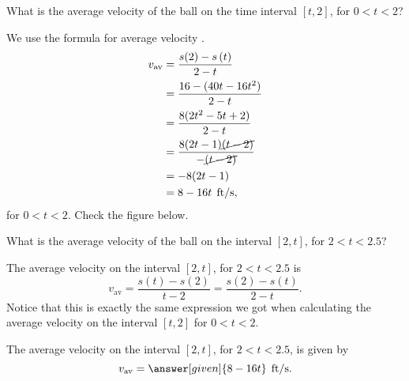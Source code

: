 \documentclass{ximera}
\begin{document}
\begin{example}
\begin{question}
\end{question}
\begin{question}
 What is the average velocity of the ball on the time interval
$[t,2]$, for $0<t<2$? 


\begin{explanation}
We use the  formula for average velocity .
\begin{align*}
v_{\text{av}} &= 
\frac{s(2)-s\left({t}\right)}
{{2}-{t}}\\
&= \frac{16 - (40t-16t^2)}{2-t}\\
&= \frac{8(2t^2-5t+2)}{2-t}\\
&= \frac{8(2t-1)\cancel{(t-2)}}{-\cancel{(t-2)}}\\
&= -8(2t-1)\\
&= 8-16t \hspace{0.06in}\mathrm{ft}/\mathrm{s},
\end{align*}
for $0<t<2$.
Check the figure below.





























\end{explanation}
\end{question}
\begin{question}
 What is the average velocity of the ball on the interval $[2,t]$, for
$2<t<2.5$?

\begin {explanation}

The average velocity on the interval $[2,t]$, for 
$2<t<2.5$ is 
\[
v_{\text{av}} = \frac{s(t)-s(2)}{t-2} = \frac{s(2)-s(t)}{2-t}. 
\]
Notice that this is exactly the same expression we got when calculating
the average velocity on the interval $[t,2]$ for $0<t<2$. 
\end{explanation}

The average velocity on the interval $[2,t]$, for $2<t<2.5$, is given by
\[
v_{\text{av}} =\answer[given]{8-16t}\hspace{0.06in}\mathrm{ft}/\mathrm{s}.
\]


\end{question}
\end{example}
\end{document}
